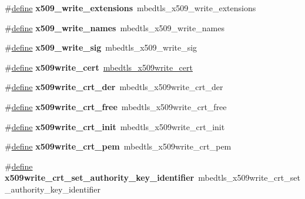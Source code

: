 \begin{DoxyCompactItemize}
\item 
\mbox{\label{compat-1_83_8h_a964ff1bb3dd9cb7e7b30bac2a808bd5e}} 
\#\hyperlink{structdefine}{define} {\bfseries x509\+\_\+write\+\_\+extensions}~mbedtls\+\_\+x509\+\_\+write\+\_\+extensions
\item 
\mbox{\label{compat-1_83_8h_a6ceb46d3704d21e5ac77929f3f14e14f}} 
\#\hyperlink{structdefine}{define} {\bfseries x509\+\_\+write\+\_\+names}~mbedtls\+\_\+x509\+\_\+write\+\_\+names
\item 
\mbox{\label{compat-1_83_8h_a36975c1a6437e8288848fbaf7a6982fe}} 
\#\hyperlink{structdefine}{define} {\bfseries x509\+\_\+write\+\_\+sig}~mbedtls\+\_\+x509\+\_\+write\+\_\+sig
\item 
\mbox{\label{compat-1_83_8h_ae735b6a7be440ec5d6a036e17c432731}} 
\#\hyperlink{structdefine}{define} {\bfseries x509write\+\_\+cert}~\hyperlink{structmbedtls__x509write__cert}{mbedtls\+\_\+x509write\+\_\+cert}
\item 
\mbox{\label{compat-1_83_8h_a5786ed7019e7a893015264f6876377ef}} 
\#\hyperlink{structdefine}{define} {\bfseries x509write\+\_\+crt\+\_\+der}~mbedtls\+\_\+x509write\+\_\+crt\+\_\+der
\item 
\mbox{\label{compat-1_83_8h_a3f65cd76b058c004714c4475b756eaac}} 
\#\hyperlink{structdefine}{define} {\bfseries x509write\+\_\+crt\+\_\+free}~mbedtls\+\_\+x509write\+\_\+crt\+\_\+free
\item 
\mbox{\label{compat-1_83_8h_a7592282e212638632ed7cbb47fa7ac99}} 
\#\hyperlink{structdefine}{define} {\bfseries x509write\+\_\+crt\+\_\+init}~mbedtls\+\_\+x509write\+\_\+crt\+\_\+init
\item 
\mbox{\label{compat-1_83_8h_a98107c20c55c5a5e6f9edf4eb2a15ef4}} 
\#\hyperlink{structdefine}{define} {\bfseries x509write\+\_\+crt\+\_\+pem}~mbedtls\+\_\+x509write\+\_\+crt\+\_\+pem
\item 
\mbox{\label{compat-1_83_8h_a0f85d09a69f6a330dcffe4a8b9fe896a}} 
\#\hyperlink{structdefine}{define} {\bfseries x509write\+\_\+crt\+\_\+set\+\_\+authority\+\_\+key\+\_\+identifier}~mbedtls\+\_\+x509write\+\_\+crt\+\_\+set\+\_\+authority\+\_\+key\+\_\+identifier

\end{DoxyCompactItemize}
